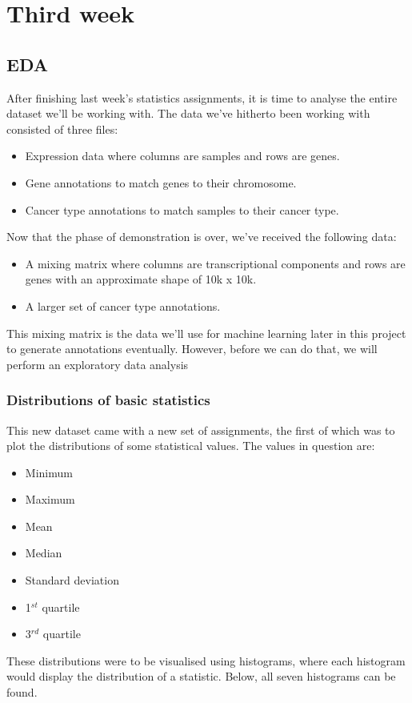 \chapter{Third week}
\section{EDA}
After finishing last week's statistics assignments, it is time to analyse the entire dataset we'll be working with.
The data we've hitherto been working with consisted of three files:
\begin{itemize}
    \item Expression data where columns are samples and rows are genes.
    \item Gene annotations to match genes to their chromosome.
    \item Cancer type annotations to match samples to their cancer type.
\end{itemize}
Now that the phase of demonstration is over, we've received the following data:
\begin{itemize}
    \item A mixing matrix where columns are transcriptional components and rows are genes with an approximate shape of 10k x 10k.
    \item A larger set of cancer type annotations.
\end{itemize}

This mixing matrix is the data we'll use for machine learning later in this project to generate annotations eventually.
However, before we can do that, we will perform an exploratory data analysis

\subsection{Distributions of basic statistics}
This new dataset came with a new set of assignments, the first of which was to plot the distributions of some statistical values.
The values in question are:
\begin{itemize}
    \item Minimum
    \item Maximum
    \item Mean
    \item Median
    \item Standard deviation
    \item 1$^{st}$ quartile
    \item 3$^{rd}$ quartile
\end{itemize}
These distributions were to be visualised using histograms, where each histogram would display the distribution of a statistic.
Below, all seven histograms can be found.

